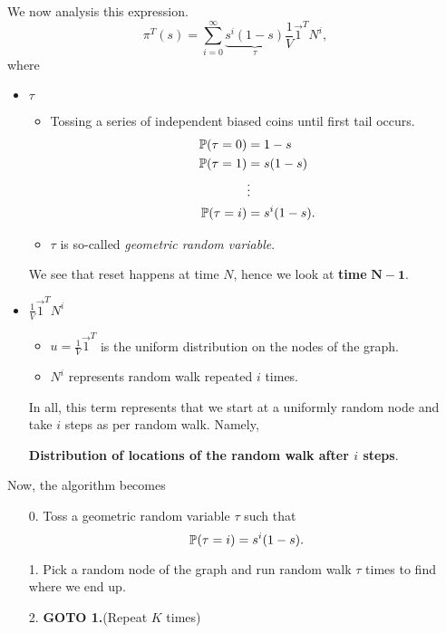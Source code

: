 We now analysis this expression.
\[
	\pi^{T}(s) = \sum\limits_{i=0}^{\infty} \underbrace{s^i (1 - s)}_{\tau}\frac{1}{V}\vec{1}^{T}N^i,
\]
where
\begin{itemize}
	\item \(\tau\)
	      \begin{itemize}
		      \item Tossing a series of independent biased coins until first tail occurs.
		            \[
			            \begin{split}
				            \mathbb{\MakeUppercase{P}}(\tau = 0) &= 1 - s\\
				            \mathbb{\MakeUppercase{P}}(\tau = 1) &= s(1 - s)\\
				            &\vdots\\
				            \mathbb{\MakeUppercase{P}}(\tau = i) &= s^i(1 - s).
			            \end{split}
		            \]
		      \item \(\tau\) is so-called \emph{geometric random variable}.
	      \end{itemize}
	      We see that reset happens at time \(N\), hence we look at \textbf{time} \(\bm{N-1}\).
	\item \(\frac{1}{V}\vec{1}^{T}N^i\)
	      \begin{itemize}
		      \item \(u = \frac{1}{V}\vec{1}^{T}\) is the uniform distribution on the nodes of the graph.
		      \item \(N^i\) represents random walk repeated \(i\) times.
	      \end{itemize}
	      In all, this term represents that we start at a uniformly random node and take \(i\) steps as per random walk. Namely,
	      \begin{center}
		      \textbf{Distribution of locations of the random walk after \(i\) steps}.
	      \end{center}
\end{itemize}

\hr

Now, the algorithm becomes
\begin{enumerate}
	\item[0.] Toss a geometric random variable \(\tau\) such that
		\[
			\mathbb{\MakeUppercase{P}}(\tau = i) = s^i(1 - s).
		\]
	\item[1.] Pick a random node of the graph and run random walk \(\tau\) times to find where we end up.
	\item[2.] \textbf{GOTO 1.}(Repeat \(K\) times)
\end{enumerate}

